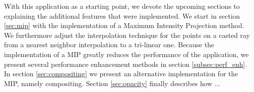 With this application as a starting point, we devote the upcoming sections to explaining the additional features that were implemented. We start in section \ref{sec:mip} with the implementation of a Maximum Intensity Projection method. We furthermore adjust the interpolation technique for the points on a casted ray from a nearest neighbor interpolation to a tri-linear one. Because the implementation of a MIP greatly reduces the performance of the application, we present several performance enhancement methods in section \ref{subsec:perf_enh}. In section \ref{sec:compositing} we present an alternative implementation for the MIP, namely compositing. Section \ref{sec:opacity} finally describes how ...\todo{!}

